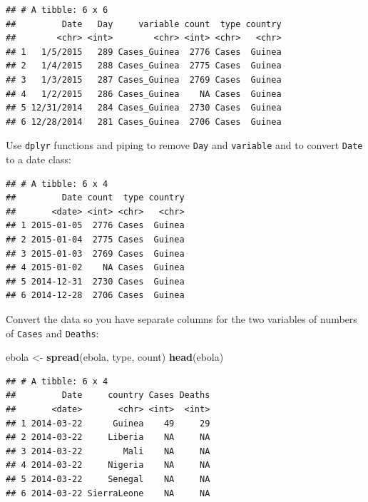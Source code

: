 \documentclass[]{book}
\makeatletter
\newenvironment{Shaded}{\begin{snugshade}}{\end{snugshade}}
\newcommand{\KeywordTok}[1]{\textcolor[rgb]{0.13,0.29,0.53}{\textbf{#1}}}
\newcommand{\DataTypeTok}[1]{\textcolor[rgb]{0.13,0.29,0.53}{#1}}
\newcommand{\StringTok}[1]{\textcolor[rgb]{0.31,0.60,0.02}{#1}}
\newcommand{\OperatorTok}[1]{\textcolor[rgb]{0.81,0.36,0.00}{\textbf{#1}}}
\newcommand{\NormalTok}[1]{#1}
\newenvironment{kframe}{%
\medskip{}
\setlength{\fboxsep}{.8em}
 \def\at@end@of@kframe{}%
 \ifinner\ifhmode%
  \def\at@end@of@kframe{\end{minipage}}%
  \begin{minipage}{\columnwidth}%
 \fi\fi%
 \def\FrameCommand##1{\hskip\@totalleftmargin \hskip-\fboxsep
 \colorbox{shadecolor}{##1}\hskip-\fboxsep
     \hskip-\linewidth \hskip-\@totalleftmargin \hskip\columnwidth}%
 \MakeFramed {\advance\hsize-\width
   \@totalleftmargin\z@ \linewidth\hsize
   \@setminipage}}%
 {\par\unskip\endMakeFramed%
 \at@end@of@kframe}
\renewenvironment{Shaded}{\begin{kframe}}{\end{kframe}}
\theoremstyle{definition}
\theoremstyle{definition}
\theoremstyle{definition}
\theoremstyle{remark}
\makeatother
\begin{document}
\begin{verbatim}
## # A tibble: 6 x 6
##         Date   Day     variable count  type country
##        <chr> <int>        <chr> <int> <chr>   <chr>
## 1   1/5/2015   289 Cases_Guinea  2776 Cases  Guinea
## 2   1/4/2015   288 Cases_Guinea  2775 Cases  Guinea
## 3   1/3/2015   287 Cases_Guinea  2769 Cases  Guinea
## 4   1/2/2015   286 Cases_Guinea    NA Cases  Guinea
## 5 12/31/2014   284 Cases_Guinea  2730 Cases  Guinea
## 6 12/28/2014   281 Cases_Guinea  2706 Cases  Guinea
\end{verbatim}

Use \texttt{dplyr} functions and piping to remove \texttt{Day} and
\texttt{variable} and to convert \texttt{Date} to a date class:

\begin{Shaded}
\end{Shaded}

\begin{verbatim}
## # A tibble: 6 x 4
##         Date count  type country
##       <date> <int> <chr>   <chr>
## 1 2015-01-05  2776 Cases  Guinea
## 2 2015-01-04  2775 Cases  Guinea
## 3 2015-01-03  2769 Cases  Guinea
## 4 2015-01-02    NA Cases  Guinea
## 5 2014-12-31  2730 Cases  Guinea
## 6 2014-12-28  2706 Cases  Guinea
\end{verbatim}

Convert the data so you have separate columns for the two variables of
numbers of \texttt{Cases} and \texttt{Deaths}:

\begin{Shaded}
\begin{Highlighting}[]
\NormalTok{ebola <-}\StringTok{ }\KeywordTok{spread}\NormalTok{(ebola, type, count)}
\KeywordTok{head}\NormalTok{(ebola)}
\end{Highlighting}
\end{Shaded}

\begin{verbatim}
## # A tibble: 6 x 4
##         Date     country Cases Deaths
##       <date>       <chr> <int>  <int>
## 1 2014-03-22      Guinea    49     29
## 2 2014-03-22     Liberia    NA     NA
## 3 2014-03-22        Mali    NA     NA
## 4 2014-03-22     Nigeria    NA     NA
## 5 2014-03-22     Senegal    NA     NA
## 6 2014-03-22 SierraLeone    NA     NA
\end{verbatim}
\end{document}
